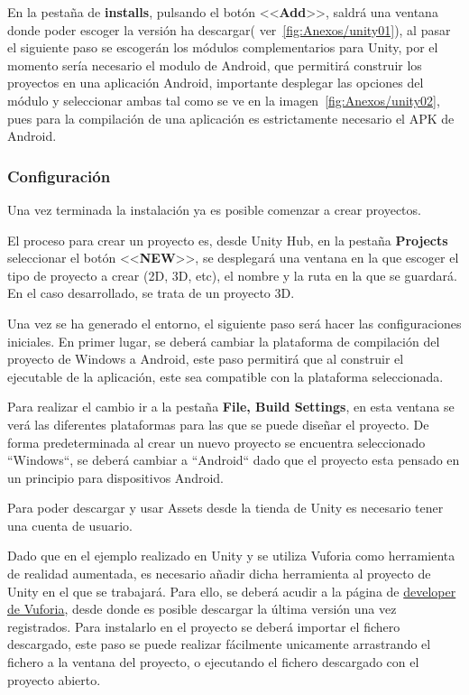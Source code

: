 En la pestaña de \textbf{installs}, pulsando el botón <<\textbf{Add}>>, saldrá una ventana donde poder escoger la versión ha descargar( ver~\ref{fig:Anexos/unity01}), al pasar el siguiente paso se escogerán los módulos complementarios para Unity, por el momento sería necesario el modulo de Android, que permitirá construir los proyectos en una aplicación Android, importante desplegar las opciones del módulo y seleccionar ambas tal como se ve en la imagen~\ref{fig:Anexos/unity02}, pues para la compilación de una aplicación es estrictamente necesario el APK de Android.



\label{sub:Confi}\subsubsection{Configuración }

Una vez terminada la instalación ya es posible comenzar a crear proyectos. 

El proceso para crear un proyecto es, desde Unity Hub, en la pestaña \textbf{Projects} seleccionar el botón <<\textbf{NEW}>>, se desplegará una ventana en la que escoger el tipo de proyecto a crear (2D, 3D, etc), el nombre y la ruta en la que se guardará. En el caso desarrollado, se trata de un proyecto 3D.

Una vez se ha generado el entorno, el siguiente paso será hacer las configuraciones iniciales. En primer lugar, se deberá cambiar la plataforma de compilación del proyecto de Windows a Android, este paso permitirá que al construir el ejecutable de la aplicación, este sea compatible con la plataforma seleccionada.

Para realizar el cambio ir a la pestaña \textbf{File, Build Settings}, en esta ventana se verá las diferentes plataformas para las que se puede diseñar el proyecto. De forma predeterminada al crear un nuevo proyecto se encuentra seleccionado ``Windows``, se deberá cambiar a ``Android`` dado que el proyecto esta pensado en un principio para dispositivos Android.

Para poder descargar y usar Assets desde la tienda de Unity es necesario tener una cuenta de usuario.

Dado que en el ejemplo realizado en Unity y se utiliza Vuforia como herramienta de realidad aumentada, es necesario añadir dicha herramienta al proyecto de Unity en el que se trabajará. Para ello, se deberá acudir a la página de \href{https://developer.vuforia.com/downloads/sdk}{developer de Vuforia}, desde donde es posible descargar la última versión una vez registrados. Para instalarlo en el proyecto se deberá importar el fichero descargado, este paso se puede realizar fácilmente unicamente arrastrando el fichero a la ventana del proyecto, o ejecutando el fichero descargado con el proyecto abierto.

